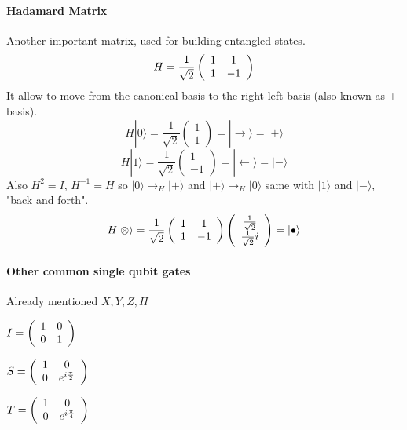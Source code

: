 \documentclass[10pt]{report}
\begin{document}
\paragraph{Hadamard Matrix} Another important matrix, used for building entangled states.
$$H=\frac{1}{\sqrt{2}}\left(\begin{array}{c c}
1&1\\1&-1
\end{array}\right)$$
It allow to move from the canonical basis to the right-left basis (also known as +- basis).
$$H|0\rangle = \frac{1}{\sqrt{2}}\left(\begin{array}{c}
1\\1
\end{array}\right) = |\rightarrow\rangle = |+\rangle$$
$$H|1\rangle = \frac{1}{\sqrt{2}}\left(\begin{array}{c}
1\\-1
\end{array}\right) = |\leftarrow\rangle = |-\rangle$$
Also $H^2 = I$, $H^{-1} = H$ so $|0\rangle\mapsto_H |+\rangle$ and $|+\rangle\mapsto_H |0\rangle$ same with $|1\rangle$ and $|-\rangle$, "back and forth".\\
$$H|\otimes\rangle = \frac{1}{\sqrt{2}}\left(\begin{array}{c c}
1&1\\1&-1
\end{array}\right)\left(\begin{array}{c}
\frac{1}{\sqrt{2}}\\\frac{1}{\sqrt{2}}i
\end{array}\right) = |\bullet\rangle$$
\paragraph{Other common single qubit gates} Already mentioned $X,Y,Z,H$\begin{list}{}{}
	\item $I = \left(\begin{array}{c c}
	1&0\\0&1
	\end{array}\right)$
	\item $S = \left(\begin{array}{c c}
	1&0\\0&e^{i\frac{\pi}{2}}
	\end{array}\right)$
	\item $T = \left(\begin{array}{c c}
	1&0\\0&e^{i\frac{\pi}{4}}
	\end{array}\right)$
\end{list}
\end{document}
